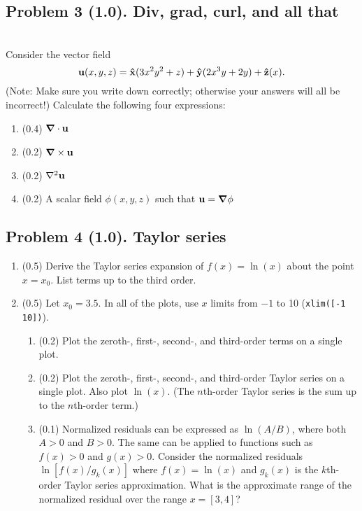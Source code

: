 \documentclass[11pt,titlepage,fleqn]{article}
\begin{document}

\pagebreak
\subsection*{Problem 3 (1.0). Div, grad, curl, and all that}

\citep[][p.~473, P13]{SteinWysession} \\
Consider the vector field
%
\begin{equation}
\mbox{${\bf u}$}(x,y,z) = \mbox{\boldmath{$\hat{\rm x}$}}(3x^2y^2 + z) + \mbox{\boldmath{$\hat{\rm y}$}}(2x^3y+2y) + \mbox{\boldmath{$\hat{\rm z}$}}(x).
\label{vec}
\end{equation}
%
(Note: Make sure you write down  correctly; otherwise your answers will all be incorrect!) Calculate the following four expressions:
%
\begin{enumerate}
\item (0.4) $\mbox{\boldmath $\nabla$} \cdot \mbox{${\bf u}$}$
\item (0.2) $\mbox{\boldmath $\nabla$} \times \mbox{${\bf u}$}$
\item (0.2) $\nabla^2\mbox{${\bf u}$}$
\item (0.2) A scalar field $\phi(x,y,z)$ such that $\mbox{${\bf u}$}=\mbox{\boldmath $\nabla$}\phi$
\end{enumerate}


\subsection*{Problem 4 (1.0). Taylor series}

\begin{enumerate}
\item (0.5) Derive the Taylor series expansion of $f(x) = \ln(x)$ about the point $x = x_0$. List terms up to the third order.

\item (0.5) Let $x_0 = 3.5$. In all of the plots, use $x$ limits from $-1$ to 10 (\verb+xlim([-1 10])+).
%
\begin{enumerate}
\item (0.2) Plot the zeroth-, first-, second-, and third-order terms on a single plot.

\item (0.2) Plot the zeroth-, first-, second-, and third-order Taylor series on a single plot. Also plot $\ln(x)$.
(The $n$th-order Taylor series is the sum up to the $n$th-order term.) 

\item (0.1) Normalized residuals can be expressed as $\ln(A/B)$, where both $A > 0$ and $B > 0$.
The same can be applied to functions such as $f(x) > 0$ and $g(x) > 0$.
Consider the normalized residuals $\ln[ f(x) / g_k(x) ]$ where $f(x) = \ln(x)$ and $g_k(x)$ is the $k$th-order Taylor series approximation. What is the approximate range of the normalized residual over the range $x = [3,4]$?
\end{enumerate}

\end{enumerate}
\end{document}
